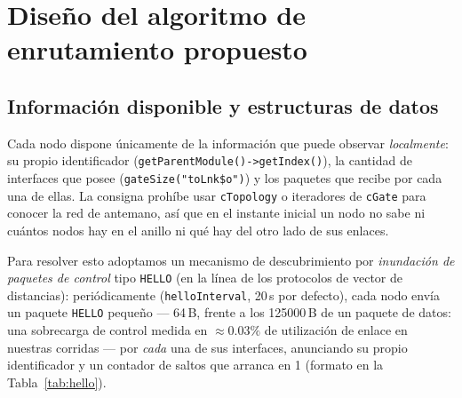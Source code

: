 \documentclass[10pt,letterpaper,twocolumn]{article}
\newcommand{\coltablesetup}{%
  \scriptsize
  \setlength{\tabcolsep}{3pt}%
  \renewcommand{\arraystretch}{1.08}%
}
\begin{document}
\section{Diseño del algoritmo de enrutamiento propuesto}
\label{sec:diseno}

\subsection{Información disponible y estructuras de datos}

Cada nodo dispone únicamente de la información que puede observar
\emph{localmente}: su propio identificador
(\texttt{getParentModule()->getIndex()}), la cantidad de interfaces que posee
(\texttt{gateSize("toLnk\$o")}) y los paquetes que recibe por cada una de
ellas. La consigna prohíbe usar \texttt{cTopology} o iteradores de
\texttt{cGate} para conocer la red de antemano, así que en el instante inicial
un nodo no sabe ni cuántos nodos hay en el anillo ni qué hay del otro lado de
sus enlaces.

Para resolver esto adoptamos un mecanismo de descubrimiento por
\emph{inundación de paquetes de control} tipo \texttt{HELLO} (en la línea de
los protocolos de vector de distancias): periódicamente
(\texttt{helloInterval}, 20\,s por defecto), cada nodo envía un paquete
\texttt{HELLO} pequeño --- 64\,B, frente a los 125000\,B de un paquete de
datos: una sobrecarga de control medida en $\approx 0.03\%$ de utilización de
enlace en nuestras corridas --- por \emph{cada} una de sus interfaces,
anunciando su propio identificador y un contador de saltos que arranca en 1
(formato en la Tabla~\ref{tab:hello}).

\begin{table}[!ht]
  \centering
  \caption{Campos relevantes del paquete de control \texttt{HELLO} (reutiliza
  la clase \texttt{Packet}, distinguido por \texttt{isHello = true}).}
  \label{tab:hello}
  \coltablesetup
\end{table}
\end{document}
